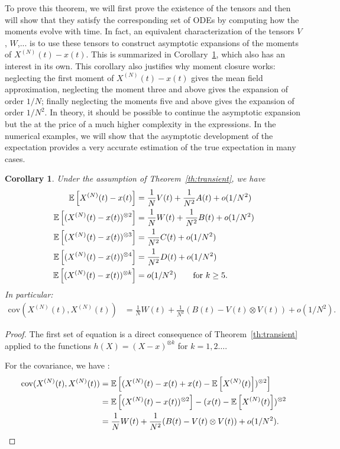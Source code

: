\documentclass[sigconf]{acmart}
\newtheorem{coro}[theorem]{Corollary}
\newcommand\XN{X^{(N)}}
\newcommand\esp[1]{{\mathchoice{\besp{#1}}{\sesp{#1}}{\sesp{#1}}{\sesp{#1}}}}
\newcommand\besp[1]{\mathbb{E}\left[#1\right]}
\newcommand\sesp[1]{\mathbb{E}[#1]}
\begin{document}
To prove this theorem, we will first prove the existence of the
tensors and then will show that they satisfy the corresponding set of
ODEs by computing how the moments evolve with time. In fact, an
equivalent characterization of the tensors $V$, $W$,...  is to use
these tensors to construct asymptotic expansions of the moments of
$\XN(t)-x(t)$. This is summarized in Corollary~\ref{coro:moment}, which
also has an interest in its own.  This corollary also justifies why
moment closure works: neglecting the first moment of $\XN(t)-x(t)$
gives the mean field approximation, neglecting the moment three and
above gives the expansion of order $1/N$; finally neglecting the moments
five and above gives the expansion of order $1/N^2$. In theory, it
should be possible to continue the asymptotic expansion but the at the
price of a much higher complexity in the expressions.
In the numerical examples, we will show that the asymptotic
development of the expectation provides a very accurate
estimation of the true expectation in many cases.
\begin{coro}
  \label{coro:moment}
  Under the assumption of Theorem~\ref{th:transient}, we have
  \begin{align*}
    \esp{\XN(t)-x(t)} &= \frac1N V(t) + \frac1{N^2} A(t) + o(1/{N^2})\\
    \esp{(\XN(t)-x(t))^{\otimes 2}} &= \frac1N W(t) + \frac1{N^2} B(t) + o(1/{N^2})\\
    \esp{(\XN(t)-x(t))^{\otimes 3}} &=  \frac1{N^2} C(t) + o(1/{N^2})\\
    \esp{(\XN(t)-x(t))^{\otimes 4} } &= \frac1{N^2} D(t) + o(1/{N^2})\\
    \esp{(\XN(t)-x(t))^{\otimes k}} &= o(1/N^2) \text{\qquad for $k\ge5$}.
  \end{align*}
  In particular:
  \begin{align*}
    \mathrm{cov}(\XN(t),\XN(t)) &= \frac1N W(t) + \frac1{N^2}(B(t) -
                              V(t)\otimes V(t))+o(1/N^2). 
  \end{align*}
\end{coro}
\begin{proof}
  The first set of equation is a direct consequence of
  Theorem~\ref{th:transient} applied to the functions
  $h(X)=(X-x)^{\otimes k}$ for $k=1,2\dots$.
  
  For the covariance, we have :
  \begin{align*}
    \mathrm{cov}(\XN(t),\XN(t))
    &= \esp{(\XN(t)-x(t)+x(t)-\esp{\XN(t)})^{\otimes 2}}\\
    &= \esp{(\XN(t)-x(t))^{\otimes2}} - (x(t)-\esp{\XN(t)})^{\otimes2}\\
    &= \frac1NW(t) + \frac1{N^2}(B(t)-V(t)\otimes V(t))+o(1/N^2). 
  \end{align*}
\end{proof}
\end{document}

